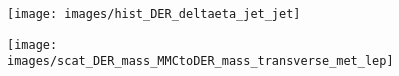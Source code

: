 \begin{figure}
\centering
\begin{minipage}{.5\textwidth}
  \centering
  \texttt{[image: images/hist\_DER\_deltaeta\_jet\_jet]}
  \label{fig:hist1}
\end{minipage}%
\begin{minipage}{.5\textwidth}
  \centering
  \texttt{[image: images/scat\_DER\_mass\_MMCtoDER\_mass\_transverse\_met\_lep]}
  \label{fig:scat1}
\end{minipage}
\end{figure}